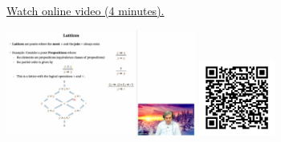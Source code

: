 
\begin{minipage}{10cm}
    \href{https://act4e-spring21.netlify.app/videos/spring2021-tradeoffs:tradeoffs:orders:lattices.html}{Watch online video (4 minutes).}
        
    \href{https://act4e-spring21.netlify.app/videos/spring2021-tradeoffs:tradeoffs:orders:lattices.html}{\includegraphics[height=3.5cm]{spring2021-tradeoffs:tradeoffs:orders:lattices/thumbnails.jpg}}
    \href{https://act4e-spring21.netlify.app/videos/spring2021-tradeoffs:tradeoffs:orders:lattices.html}{\includegraphics[height=2.5cm]{spring2021-tradeoffs:tradeoffs:orders:lattices/qrcode.png}}
\end{minipage}
